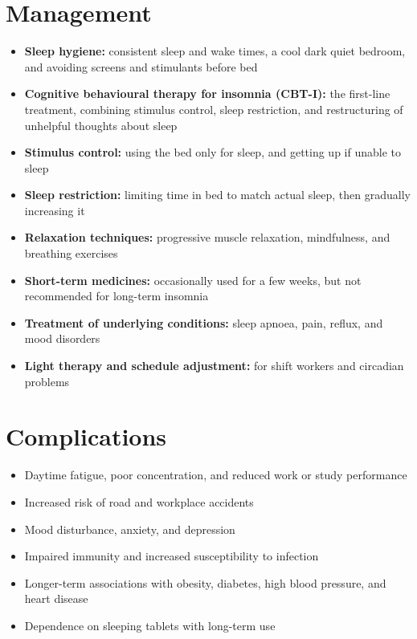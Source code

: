 \section*{Management}
\begin{itemize}
    \item \textbf{Sleep hygiene:} consistent sleep and wake times, a cool dark quiet bedroom, and avoiding screens and stimulants before bed
    \item \textbf{Cognitive behavioural therapy for insomnia (CBT-I):} the first-line treatment, combining stimulus control, sleep restriction, and restructuring of unhelpful thoughts about sleep
    \item \textbf{Stimulus control:} using the bed only for sleep, and getting up if unable to sleep
    \item \textbf{Sleep restriction:} limiting time in bed to match actual sleep, then gradually increasing it
    \item \textbf{Relaxation techniques:} progressive muscle relaxation, mindfulness, and breathing exercises
    \item \textbf{Short-term medicines:} occasionally used for a few weeks, but not recommended for long-term insomnia
    \item \textbf{Treatment of underlying conditions:} sleep apnoea, pain, reflux, and mood disorders
    \item \textbf{Light therapy and schedule adjustment:} for shift workers and circadian problems
\end{itemize}

\section*{Complications}
\begin{itemize}
    \item Daytime fatigue, poor concentration, and reduced work or study performance
    \item Increased risk of road and workplace accidents
    \item Mood disturbance, anxiety, and depression
    \item Impaired immunity and increased susceptibility to infection
    \item Longer-term associations with obesity, diabetes, high blood pressure, and heart disease
    \item Dependence on sleeping tablets with long-term use
\end{itemize}

